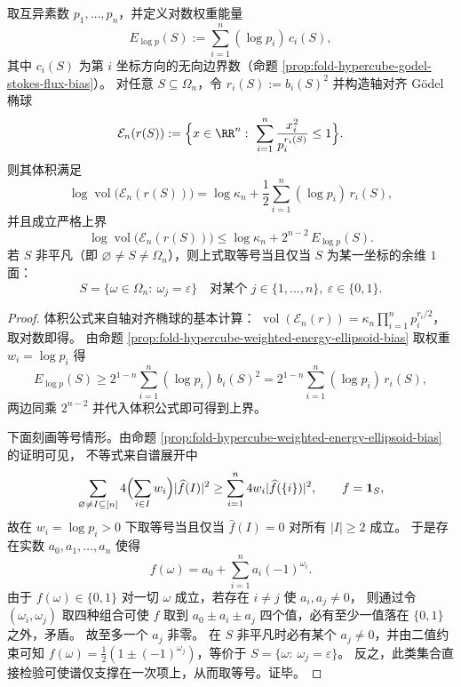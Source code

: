 \begin{theorem}\label{thm:fold-hypercube-godel-ellipsoid-volume-energy-rigidity}
取互异素数 \(p_1,\dots,p_n\)，并定义对数权重能量
\[
E_{\log p}(S):=\sum_{i=1}^n (\log p_i)\,c_i(S),
\]
其中 \(c_i(S)\) 为第 \(i\) 坐标方向的无向边界数（命题 \ref{prop:fold-hypercube-godel-stokes-flux-bias}）。
对任意 \(S\subseteq\Omega_n\)，令
\(
r_i(S):=b_i(S)^2
\)
并构造轴对齐 Gödel 椭球
\[
\mathcal E_n(r(S))
:=\Bigl\{x\in\RR^n:\ \sum_{i=1}^n \frac{x_i^2}{p_i^{r_i(S)}}\le 1\Bigr\}.
\]
则其体积满足
\[
\log\operatorname{vol}\bigl(\mathcal E_n(r(S))\bigr)
=\log\kappa_n+\frac12\sum_{i=1}^n (\log p_i)\,r_i(S),
\]
并且成立严格上界
\[
\log\operatorname{vol}\bigl(\mathcal E_n(r(S))\bigr)
\le
\log\kappa_n+2^{n-2}\,E_{\log p}(S).
\]
若 \(S\) 非平凡（即 \(\varnothing\ne S\ne\Omega_n\)），则上式取等号当且仅当 \(S\) 为某一坐标的余维 \(1\) 面：
\[
S=\{\omega\in\Omega_n:\ \omega_j=\varepsilon\}
\quad\text{对某个 }j\in\{1,\dots,n\},\ \varepsilon\in\{0,1\}.
\]
\end{theorem}
\begin{proof}
体积公式来自轴对齐椭球的基本计算：
\(
\operatorname{vol}(\mathcal E_n(r))=\kappa_n\prod_{i=1}^n p_i^{r_i/2}
\)，取对数即得。
由命题 \ref{prop:fold-hypercube-weighted-energy-ellipsoid-bias} 取权重 \(w_i=\log p_i\) 得
\[
E_{\log p}(S)\ge 2^{1-n}\sum_{i=1}^n(\log p_i)\,b_i(S)^2
=2^{1-n}\sum_{i=1}^n(\log p_i)\,r_i(S),
\]
两边同乘 \(2^{n-2}\) 并代入体积公式即可得到上界。
\par
下面刻画等号情形。由命题 \ref{prop:fold-hypercube-weighted-energy-ellipsoid-bias} 的证明可见，
不等式来自谱展开中
\[
\sum_{\varnothing\ne I\subseteq[n]}4\Bigl(\sum_{i\in I}w_i\Bigr)|\widehat f(I)|^2
\ge
\sum_{i=1}^n 4w_i|\widehat f(\{i\})|^2,
\qquad f=\mathbf 1_S,
\]
故在 \(w_i=\log p_i>0\) 下取等号当且仅当 \(\widehat f(I)=0\) 对所有 \(|I|\ge 2\) 成立。
于是存在实数 \(a_0,a_1,\dots,a_n\) 使得
\[
f(\omega)=a_0+\sum_{i=1}^n a_i(-1)^{\omega_i}.
\]
由于 \(f(\omega)\in\{0,1\}\) 对一切 \(\omega\) 成立，若存在 \(i\ne j\) 使 \(a_i,a_j\ne 0\)，
则通过令 \((\omega_i,\omega_j)\) 取四种组合可使 \(f\) 取到 \(a_0\pm a_i\pm a_j\) 四个值，必有至少一值落在 \(\{0,1\}\) 之外，矛盾。
故至多一个 \(a_j\) 非零。
在 \(S\) 非平凡时必有某个 \(a_j\ne 0\)，并由二值约束可知
\(
f(\omega)=\frac12(1\pm (-1)^{\omega_j})
\)，等价于
\(
S=\{\omega:\ \omega_j=\varepsilon\}
\)。
反之，此类集合直接检验可使谱仅支撑在一次项上，从而取等号。证毕。
\end{proof}

